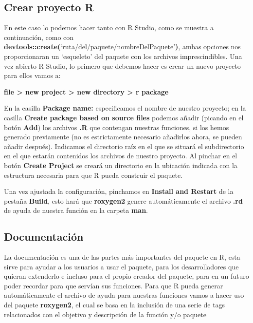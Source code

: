\subsection{Crear proyecto R}

En este caso lo podemos hacer tanto con R Studio, como se muestra a continuaci\'on,
como con \textbf{devtools::create(}\enquote*{ruta/del/paquete/nombreDelPaquete}\textbf{)}, ambas opciones nos
proporcionaran un \enquote*{esqueleto} del paquete con los archivos imprescindibles.
Una vez abierto R Studio, lo primero que debemos hacer es crear un nuevo proyecto para
ellos vamos a: 
\begin{center}
    \textbf{file > new project > new directory > r package} 
\end{center}

En la casilla \textbf{Package name:} especificamos el nombre de nuestro proyecto; en la casilla
\textbf{Create package based on source files} podemos a\~nadir (picando en el bot\'on \textbf{Add}) los
archivos \textbf{.R} que contengan nuestras funciones, si los hemos generado previamente (no es
estrictamente necesario a\~nadirlos ahora, se pueden a\~nadir despu\'es).
Indicamos el directorio ra\'iz en el que se situar\'a el subdirectorio en el que estar\'an
contenidos los archivos de nuestro proyecto. 
Al pinchar en el bot\'on \textbf{Create Project} se crear\'a un directorio en la ubicaci\'on indicada con la
estructura necesaria para que R pueda construir el paquete.

Una vez ajustada la configuración, pinchamos en \textbf{Install and Restart} de la pestaña \textbf{Build}, esto hará que \textbf{roxygen2} genere automáticamente el archivo \textbf{.rd} de ayuda de nuestra función en la carpeta \textbf{man}.

\subsection{Documentaci\'on}

La documentaci\'on es una de las partes m\'as importantes del paquete en R, esta sirve para
ayudar a los usuarios a usar el paquete, para los desarrolladores que quieran extenderlo e
incluso para el propio creador del paquete, para en un futuro poder recordar para que serv\'ian
sus funciones.
Para que R pueda generar autom\'aticamente el archivo de ayuda para nuestras funciones
vamos a hacer uso del paquete \textbf{roxygen2}, el cual se basa en la inclusi\'on de una serie de tags relacionados con el objetivo y descripci\'on de la funci\'on y/o paquete 


